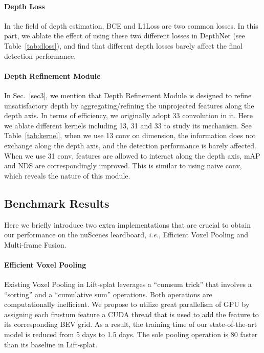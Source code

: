 \documentclass[twocolumn,letterpaper]{article}
\begin{document}
\paragraph{Depth Loss} In the field of depth estimation, BCE and L1Loss are two common losses. In this part, we ablate the effect of using these two different losses in DepthNet (see Table~\ref{tab:dloss}), and find that different depth losses barely affect the final detection performance.

\paragraph{Depth Refinement Module} In Sec.~\ref{sec3}, we mention that Depth Refinement Module is designed to refine unsatisfactory depth by aggregating/refining the unprojected features along the depth axis. In terms of efficiency, we originally adopt 33 convolution in it. Here we ablate different kernels including 13, 31 and 33 to study its mechanism. See Table~\ref{tab:kernel}, when we use 13 conv on  dimension, the information does not exchange along the depth axis, and the detection performance is barely affected. When we use 31 conv, features are allowed to interact along the depth axis, mAP and NDS are correspondingly improved. This is similar to using naive  conv, which reveals the nature of this module.


\subsection{Benchmark Results}

Here we briefly introduce two extra implementations that are crucial to obtain our performance on the nuScenes leardboard, \emph{i.e.}, Efficient Voxel Pooling and Multi-frame Fusion.

\paragraph{Efficient Voxel Pooling} Existing Voxel Pooling in Lift-splat leverages a ``cumsum trick'' that involves a ``sorting'' and a ``cumulative sum'' operations. Both operations are computationally inefficient. We propose to utilize great parallelism of GPU by assigning each frustum feature a CUDA thread that is used to add the feature to its corresponding BEV grid. As a result, the training time of our state-of-the-art model is reduced from 5 days to 1.5 days. The sole pooling operation is 80 faster than its baseline in Lift-splat.
\end{document}
